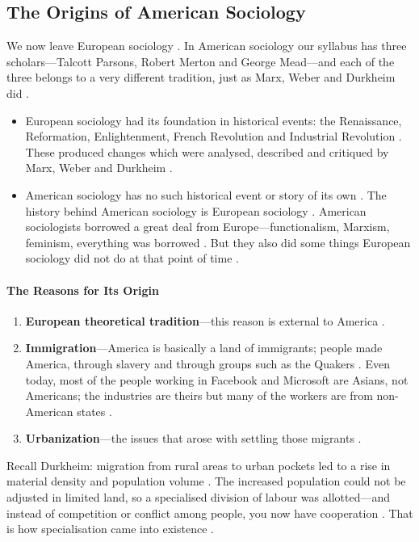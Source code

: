 \subsection{The Origins of American Sociology}
We now leave European sociology . In American sociology our syllabus has three scholars---Talcott Parsons, Robert Merton and George Mead---and each of the three belongs to a very different tradition, just as Marx, Weber and Durkheim did .

\begin{ComparisonBox}
\begin{itemize}
    \item European sociology had its foundation in historical events: the Renaissance, Reformation, Enlightenment, French Revolution and Industrial Revolution . These produced changes which were analysed, described and critiqued by Marx, Weber and Durkheim .
    \item American sociology has no such historical event or story of its own . The history behind American sociology is European sociology . American sociologists borrowed a great deal from Europe---functionalism, Marxism, feminism, everything was borrowed . But they also did some things European sociology did not do at that point of time .
\end{itemize}
\end{ComparisonBox}

\paragraph{The Reasons for Its Origin}
\begin{enumerate}
    \item \textbf{European theoretical tradition}---this reason is external to America .
    \item \textbf{Immigration}---America is basically a land of immigrants; people made America, through slavery and through groups such as the Quakers . Even today, most of the people working in Facebook and Microsoft are Asians, not Americans; the industries are theirs but many of the workers are from non-American states .
    \item \textbf{Urbanization}---the issues that arose with settling those migrants .
\end{enumerate}

\begin{ComparisonBox}
Recall Durkheim: migration from rural areas to urban pockets led to a rise in material density and population volume . The increased population could not be adjusted in limited land, so a specialised division of labour was allotted---and instead of competition or conflict among people, you now have cooperation . That is how specialisation came into existence .
\end{ComparisonBox}


